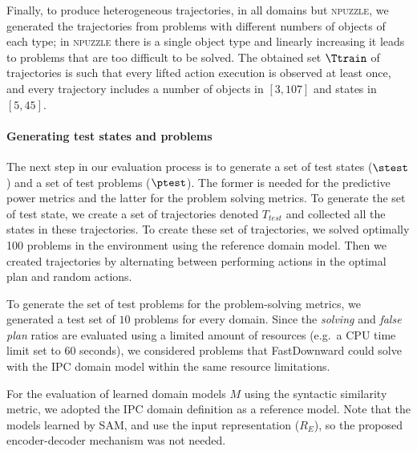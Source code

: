 %
Finally, to produce heterogeneous trajectories, in all domains but \textsc{npuzzle}, we generated the trajectories from problems with different numbers of objects of each type; in \textsc{npuzzle} there is a single object type and linearly increasing it leads to problems that are too difficult to be solved. 
%
The obtained set $\Ttrain$ of trajectories is such that every lifted action execution is observed at least once, and every trajectory includes a number of objects in $[3, 107]$ and states in $[5, 45]$\footnotemark[3].



\paragraph{Generating test states and problems}
The next step in our evaluation process is to generate a set of test states ($\stest$) and a set of test problems ($\ptest$). The former is needed for the predictive power metrics and the latter for the problem solving metrics. 
To generate the set of test state, we create a set of trajectories denoted $T_{test}$ and collected all the states in these trajectories. 
To create these set of trajectories, we solved optimally 100 problems in the environment using the reference domain model. Then we created trajectories by alternating between performing actions in the optimal plan and random actions. 

%
To generate the set of test problems for the problem-solving metrics, we generated a test set \ptest of $10$ problems for every domain. Since the \emph{solving} and \emph{false plan} ratios are evaluated using a limited amount of resources (e.g.\ a CPU time limit set to $60$ seconds), we considered problems that FastDownward could solve with the IPC domain model within the same resource limitations.


For the evaluation of learned domain models $M$ using the syntactic similarity metric, we adopted the IPC domain definition as a reference model. 
Note that the models learned by SAM, \offlam{} and \nolam{} use the input representation ($R_E$), so the proposed encoder-decoder mechanism was not needed.
%
